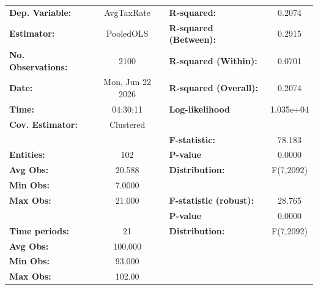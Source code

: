 \begin{center}
\begin{tabular}{lclc}
\toprule
\textbf{Dep. Variable:}                       &     AvgTaxRate     & \textbf{  R-squared:         }   &      0.2074      \\
\textbf{Estimator:}                           &     PooledOLS      & \textbf{  R-squared (Between):}  &      0.2915      \\
\textbf{No. Observations:}                    &        2100        & \textbf{  R-squared (Within):}   &      0.0701      \\
\textbf{Date:}                                &  Mon, Jun 22 2026  & \textbf{  R-squared (Overall):}  &      0.2074      \\
\textbf{Time:}                                &      04:30:11      & \textbf{  Log-likelihood     }   &    1.035e+04     \\
\textbf{Cov. Estimator:}                      &     Clustered      & \textbf{                     }   &                  \\
\textbf{}                                     &                    & \textbf{  F-statistic:       }   &      78.183      \\
\textbf{Entities:}                            &        102         & \textbf{  P-value            }   &      0.0000      \\
\textbf{Avg Obs:}                             &       20.588       & \textbf{  Distribution:      }   &    F(7,2092)     \\
\textbf{Min Obs:}                             &       7.0000       & \textbf{                     }   &                  \\
\textbf{Max Obs:}                             &       21.000       & \textbf{  F-statistic (robust):} &      28.765      \\
\textbf{}                                     &                    & \textbf{  P-value            }   &      0.0000      \\
\textbf{Time periods:}                        &         21         & \textbf{  Distribution:      }   &    F(7,2092)     \\
\textbf{Avg Obs:}                             &      100.000       & \textbf{                     }   &                  \\
\textbf{Min Obs:}                             &       93.000       & \textbf{                     }   &                  \\
\textbf{Max Obs:}                             &       102.00       & \textbf{                     }   &                  \\

\end{tabular}
\end{center}
